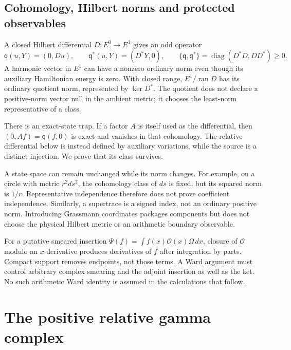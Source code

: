\documentclass[11pt]{article}
\numberwithin{equation}{section}
\theoremstyle{definition}
\theoremstyle{remark}
\newcommand{\ran}{\operatorname{ran}}
\newcommand{\qq}{\mathsf q}
\begin{document}
\subsection{Cohomology, Hilbert norms and protected observables}
A closed Hilbert differential $D:E^0\to E^1$ gives an odd operator
\begin{equation}
 \qq(u,Y)=(0,Du),\qquad
 \qq^*(u,Y)=(D^*Y,0),\qquad
 \{\qq,\qq^*\}=\operatorname{diag}(D^*D,DD^*)\ge0.
 \label{eq:susy}
\end{equation}
A harmonic vector in $E^1$ can have a nonzero ordinary norm even though its auxiliary Hamiltonian energy is zero. With closed range, $E^1/\ran D$ has its ordinary quotient norm, represented by $\ker D^*$. The quotient does not declare a positive-norm vector null in the ambient metric; it chooses the least-norm representative of a class.

There is an exact-state trap. If a factor $A$ is itself used as the differential, then $(0,Af)=\qq(f,0)$ is exact and vanishes in that cohomology. The relative differential below is instead defined by auxiliary variations, while the source is a distinct injection. We prove that its class survives.

A state space can remain unchanged while its norm changes. For example, on a circle with metric $r^2ds^2$, the cohomology class of $ds$ is fixed, but its squared norm is $1/r$. Representative independence therefore does not prove coefficient independence. Similarly, a supertrace is a signed index, not an ordinary positive norm. Introducing Grassmann coordinates packages components but does not choose the physical Hilbert metric or an arithmetic boundary observable.

For a putative smeared insertion $\Psi(f)=\int f(x)\mathcal O(x)\Omega\,dx$, closure of $\mathcal O$ modulo an $x$-derivative produces derivatives of $f$ after integration by parts. Compact support removes endpoints, not those terms. A Ward argument must control arbitrary complex smearing and the adjoint insertion as well as the ket. No such arithmetic Ward identity is assumed in the calculations that follow.

\section{The positive relative gamma complex}
\label{sec:gamma}
\end{document}
